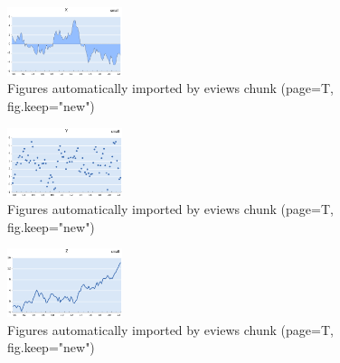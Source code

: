 \documentclass[
]{article}
\begin{document}
\begin{figure}[H]

{\centering \includegraphics[width=0.3\textwidth,height=0.25\textwidth]{eviews_graphs_files/figure-latex//saniya-small-sag1} 

}

\caption{Figures automatically imported by eviews chunk (page=T, fig.keep="new")}\label{fig:saniya-1}
\end{figure}
\begin{figure}[H]

{\centering \includegraphics[width=0.3\textwidth,height=0.25\textwidth]{eviews_graphs_files/figure-latex//saniya-small-sag2} 

}

\caption{Figures automatically imported by eviews chunk (page=T, fig.keep="new")}\label{fig:saniya-2}
\end{figure}
\begin{figure}[H]

{\centering \includegraphics[width=0.3\textwidth,height=0.25\textwidth]{eviews_graphs_files/figure-latex//saniya-small-sag3} 

}

\caption{Figures automatically imported by eviews chunk (page=T, fig.keep="new")}\label{fig:saniya-3}
\end{figure}
\end{document}
